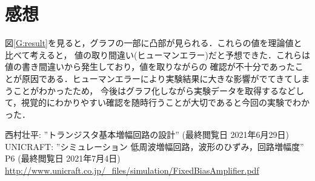 \documentclass[a4paper,11pt]{jsarticle}
\begin{document}
\section{感想}
図\ref{G:result}を見ると，グラフの一部に凸部が見られる．これらの値を理論値と比べて考えると，
値の取り間違い(ヒューマンエラー)だと予想できた．これらは値の書き間違いから発生しており，値を取りながらの
確認が不十分であったことが原因である．ヒューマンエラーにより実験結果に大きな影響がでてきてしまうことがわかったため，
今後はグラフ化しながら実験データを取得するなどして，視覚的にわかりやすい確認を随時行うことが大切であると今回の実験でわかった．

\begin{thebibliography}{99}
   西村壮平: ''トランジスタ基本増幅回路の設計'' (最終閲覧日 2021年6月29日)
   UNICRAFT: ''シミュレーション 低周波増幅回路，波形のひずみ，回路増幅度'' P6 (最終閲覧日 2021年7月4日) \\ \url{http://www.unicraft.co.jp/_files/simulation/FixedBiasAmplifier.pdf}

\end{thebibliography}
\end{document}
